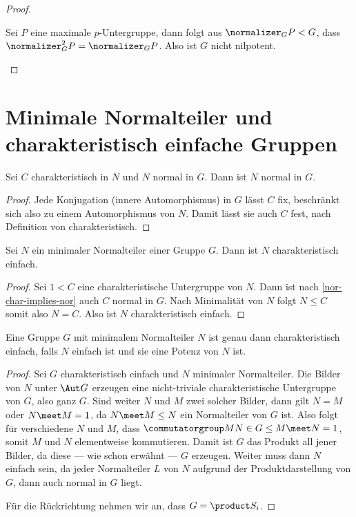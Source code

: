 \begin{proof}
    \begin{statements}
        \item Sei $P$ eine maximale $p$-Untergruppe, dann folgt aus $\normalizer_G P < G$, dass $\normalizer^2_G P = \normalizer_G
    P$. Also ist $G$ nicht nilpotent.
    \end{statements}
\end{proof}

\section{Minimale Normalteiler und charakteristisch einfache Gruppen}

\begin{lemma}\label{nor-char-implies-nor}
    Sei $C$ charakteristisch in $N$ und $N$ normal in $G$. Dann ist $N$ normal in $G$.
\end{lemma}

\begin{proof}
Jede Konjugation (innere Automorphismus) in $G$ lässt $C$ fix, beschränkt sich also zu einem Automorphismus von $N$. Damit lässt
sie auch $C$ fest, nach Definition von charakteristisch.    
\end{proof}

\begin{lemma}
    Sei $N$ ein minimaler Normalteiler einer Gruppe $G$. Dann ist $N$ charakteristisch einfach.
\end{lemma}

\begin{proof}
    Sei $1<C$ eine charakteristische Untergruppe von $N$. Dann ist nach \ref{nor-char-implies-nor} auch $C$ normal in $G$. Nach
    Minimalität von $N$ folgt $N\leq C$ somit also $N=C$. Also ist $N$ charakteristisch einfach.
\end{proof}

\begin{theorem}
    Eine Gruppe $G$ mit minimalem Normalteiler $N$ ist genau dann charakteristisch einfach, falls $N$ einfach ist und sie eine Potenz von $N$ ist.
\end{theorem}

\begin{proof}
    Sei $G$ charakteristisch einfach und $N$ minimaler Normalteiler. Die Bilder von $N$ unter $\Aut G$ erzeugen eine nicht-triviale
    charakteristische Untergruppe von $G$, also ganz $G$. Sind weiter $N$ und $M$ zwei solcher Bilder, dann gilt $N = M$ oder
    $N\meet M = 1$, da $N\meet M\leq N$ ein Normalteiler von $G$ ist. Also folgt für verschiedene $N$ und $M$, dass
    $\commutatorgroup M N \in G \leq M\meet N = 1$, somit $M$ und $N$ elementweise kommutieren. Damit ist $G$ das Produkt all
    jener Bilder, da diese --- wie schon erwähnt --- $G$ erzeugen. Weiter muss dann $N$ einfach sein, da jeder Normalteiler $L$ von
    $N$ aufgrund der Produktdarstellung von $G$, dann auch normal in $G$ liegt.

    Für die Rückrichtung nehmen wir an, dass $G = \product S_i$. 
\end{proof}

